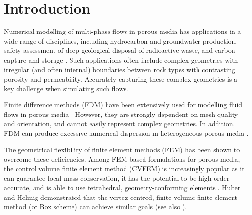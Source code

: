 \documentclass[times]{fldauth}
\begin{document}
\section{Introduction}

Numerical modelling of multi-phase flows in porous media has
applications in a wide range of disciplines, including hydrocarbon and
groundwater production, safety assessment of deep geological disposal
of radioactive waste, and carbon capture and storage \cite{chen_2006,
  aiea_1999, pruess_1990c, jiang_2011}. Such applications often
include complex geometries with irregular (and often internal)
boundaries between rock types with contrasting porosity and
permeability. Accurately capturing these complex geometries is a key
challenge when simulating such flows.

Finite difference methods (FDM) have been extensively used for
modelling fluid flows in porous media
\cite{aziz_1986, chen_1997, chen_2005}. However, they are strongly
dependent on mesh quality and orientation, and cannot easily represent
complex geometries. In addition, FDM can produce excessive numerical
dispersion in heterogeneous porous media \cite{chavent_1986}. 

The geometrical flexibility of finite element methods (FEM) has been
shown to overcome these deficiencies. Among FEM-based formulations for
porous media, the control volume finite element method (CVFEM) is
increasingly popular as it can guarantee local mass conservation, it
has the potential to be high-order accurate, and is able to use
tetrahedral, geometry-conforming elements \cite{forsyth_1990,
  cordazzo_2004, geiger_2004, hurtado_2007}. Huber and Helmig \cite{huber_2000}
demonstrated that the vertex-centred, finite volume-finite element
method (or Box scheme) can achieve similar goals (see also \cite{helmig_1997}).
\end{document}
